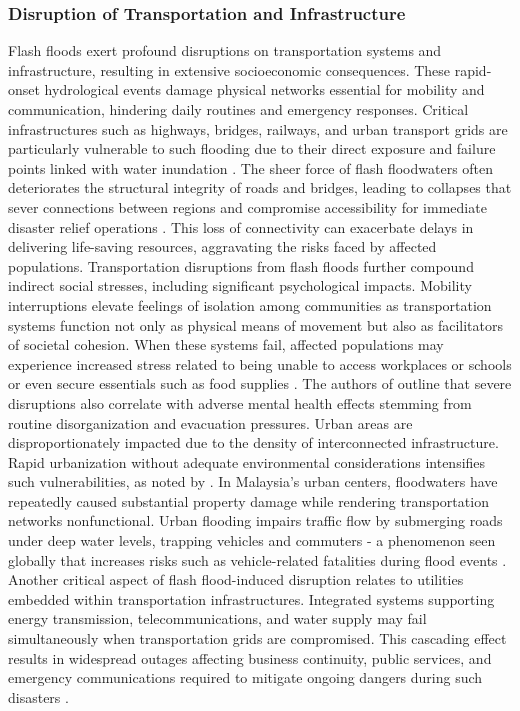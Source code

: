 \subsubsection{Disruption of Transportation and Infrastructure}
Flash floods exert profound disruptions on transportation systems and infrastructure, resulting in extensive socioeconomic consequences. These rapid-onset hydrological events damage physical networks essential for mobility and communication, hindering daily routines and emergency responses. Critical infrastructures such as highways, bridges, railways, and urban transport grids are particularly vulnerable to such flooding due to their direct exposure and failure points linked with water inundation \citep{Abegaz2024}\citep{AlRawas2024}.
The sheer force of flash floodwaters often deteriorates the structural integrity of roads and bridges, leading to collapses that sever connections between regions and compromise accessibility for immediate disaster relief operations \citep{Abegaz2024}\citep{Saad2024}. This loss of connectivity can exacerbate delays in delivering life-saving resources, aggravating the risks faced by affected populations.
Transportation disruptions from flash floods further compound indirect social stresses, including significant psychological impacts. Mobility interruptions elevate feelings of isolation among communities as transportation systems function not only as physical means of movement but also as facilitators of societal cohesion. When these systems fail, affected populations may experience increased stress related to being unable to access workplaces or schools or even secure essentials such as food supplies \citep{Lowrie2022}. The authors of \citep{Laudan2020} outline that severe disruptions also correlate with adverse mental health effects stemming from routine disorganization and evacuation pressures.
Urban areas are disproportionately impacted due to the density of interconnected infrastructure. Rapid urbanization without adequate environmental considerations intensifies such vulnerabilities, as noted by \citep{Saad2024}. In Malaysia's urban centers, floodwaters have repeatedly caused substantial property damage while rendering transportation networks nonfunctional. Urban flooding impairs traffic flow by submerging roads under deep water levels, trapping vehicles and commuters - a phenomenon seen globally that increases risks such as vehicle-related fatalities during flood events \citep{Lowrie2022}\citep{Saad2024}.
Another critical aspect of flash flood-induced disruption relates to utilities embedded within transportation infrastructures. Integrated systems supporting energy transmission, telecommunications, and water supply may fail simultaneously when transportation grids are compromised. This cascading effect results in widespread outages affecting business continuity, public services, and emergency communications required to mitigate ongoing dangers during such disasters \citep{Abegaz2024}\citep{Saad2024}.
